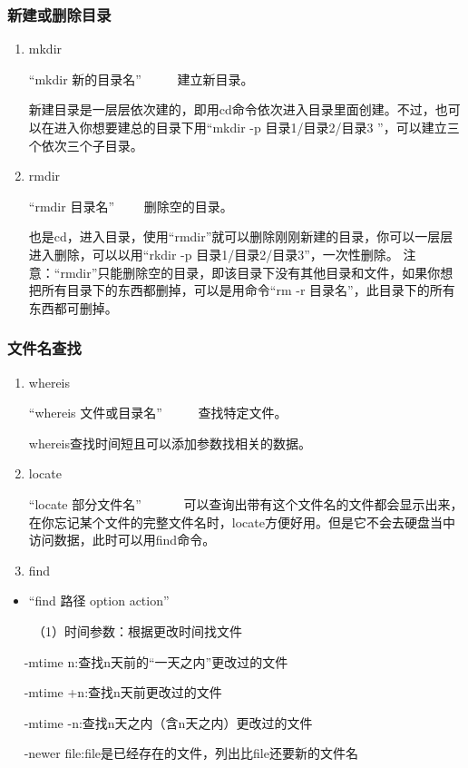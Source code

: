 \documentclass{article}
\begin{document}
\subsubsection{新建或删除目录}
\begin{enumerate}
\item mkdir

“mkdir 新的目录名”  ~~~~~建立新目录。

新建目录是一层层依次建的，即用cd命令依次进入目录里面创建。不过，也可以在进入你想要建总的目录下用“mkdir -p 目录1/目录2/目录3 ”，可以建立三个依次三个子目录。

\item rmdir

“rmdir 目录名”  ~~~~删除空的目录。

也是cd，进入目录，使用“rmdir”就可以删除刚刚新建的目录，你可以一层层进入删除，可以以用“rkdir -p 目录1/目录2/目录3”，一次性删除。
{\color{red}注意：}“{\color{red}rmdir}”只能删除{\color{red}空的目录}，即该目录下没有其他目录和文件，如果你想把所有目录下的东西都删掉，可以是用命令“rm -r 目录名”，此目录下的所有东西都可删掉。
\end{enumerate}
\subsubsection{文件名查找}
\begin{enumerate}
\item whereis

“whereis 文件或目录名”  ~~~~~查找特定文件。

whereis查找时间短且可以添加参数找相关的数据。

\item locate

“locate 部分文件名” ~~~~~~可以查询出带有这个文件名的文件都会显示出来，在你忘记某个文件的完整文件名时，locate方便好用。但是它不会去硬盘当中访问数据，此时可以用find命令。
\item find
\end{enumerate}
\begin{itemize}
\item  “find 路径 option action” 
\end {itemize}
 ~~~~（1）时间参数：根据更改时间找文件

~~ -mtime n:查找n天前的“一天之内”更改过的文件

~~ -mtime +n:查找n天前更改过的文件

~~ -mtime -n:查找n天之内（含n天之内）更改过的文件

~~ -newer file:file是已经存在的文件，列出比file还要新的文件名
\end{document}
